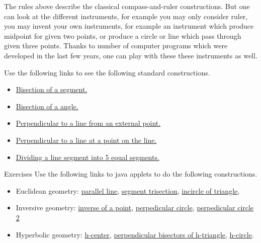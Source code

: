 The rules above describe the classical compass-and-ruler constructions. 
But one can look at the different instruments, for example
you may only consider ruler,
you may invent your own instruments, for example an instrument which produce midpoint for given two points, or produce a circle or line which pass through given three points.
Thanks to number of computer programs which were developed in the last few years, one can play with these these instruments as well. 


Use the following links to see the following standard constructions.
\begin{itemize}
\item \href{run:./car/segment-bisector.html}{Bisection of a segment.}
\item \href{run:./car/angle-bisector.html}{Bisection of a angle.}
\item \href{run:./car/perpendicular-1.html}{Perpendicular to a line from an external point.}
\item \href{run:./car/perpendicular-2.html}{Perpendicular to a line at a point on the line.}
\item \href{run:./car/5-sect.html}{Dividing a line segment into 5 equal segments.}
\end{itemize}

\begin{thm}{Exercises}
Use the following links to java applets to do the following constructions. 
\begin{itemize}
\item Euclidean geometry: 
\href{run:./car/parallel.html}{parallel line}, 
\href{run:./car/trisection.html}{segment trisection}, 
\href{run:./car/incircle.html}{incircle of triangle},
\item Inversive geometry: 
\href{run:./car/inverse.html}{inverse of a point}, 
\href{run:./car/h-line.html}{perpedicular circle}, 
\href{run:./car/perpendicular-circles.html}{perpedicular circle 2}
\item Hyperbolic geometry: 
\href{run:./car/h-center.html}{h-center}, 
\href{run:./car/h-triangle.html}{perpendicular bisectors of h-triangle}, 
\href{run:./h-equal.html}{h-circle}.
\end{itemize}
\end{thm}
















